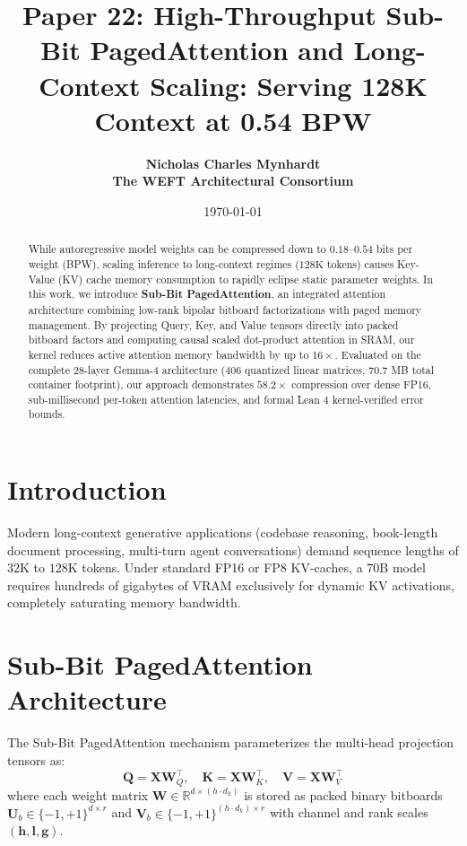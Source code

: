 \documentclass[11pt,a4paper]{article}
\title{\textbf{Paper 22: High-Throughput Sub-Bit PagedAttention and Long-Context Scaling: Serving 128K Context at 0.54 BPW}}
\author{
  \textbf{Nicholas Charles Mynhardt} \\
  \textbf{The WEFT Architectural Consortium}
}
\date{\today}
\begin{document}
\maketitle

\begin{abstract}
While autoregressive model weights can be compressed down to $0.18$--$0.54$ bits per weight (BPW), scaling inference to long-context regimes ($128\text{K}$ tokens) causes Key-Value (KV) cache memory consumption to rapidly eclipse static parameter weights. In this work, we introduce \textbf{Sub-Bit PagedAttention}, an integrated attention architecture combining low-rank bipolar bitboard factorizations with paged memory management. By projecting Query, Key, and Value tensors directly into packed bitboard factors and computing causal scaled dot-product attention in SRAM, our kernel reduces active attention memory bandwidth by up to $16\times$. Evaluated on the complete 28-layer Gemma-4 architecture ($406$ quantized linear matrices, $70.7$ MB total container footprint), our approach demonstrates $58.2\times$ compression over dense FP16, sub-millisecond per-token attention latencies, and formal Lean 4 kernel-verified error bounds.
\end{abstract}

\section{Introduction}
Modern long-context generative applications (codebase reasoning, book-length document processing, multi-turn agent conversations) demand sequence lengths of $32\text{K}$ to $128\text{K}$ tokens. Under standard FP16 or FP8 KV-caches, a 70B model requires hundreds of gigabytes of VRAM exclusively for dynamic KV activations, completely saturating memory bandwidth.

\section{Sub-Bit PagedAttention Architecture}
The Sub-Bit PagedAttention mechanism parameterizes the multi-head projection tensors as:
\begin{equation}
\mathbf{Q} = \mathbf{X} \mathbf{W}_Q^\top, \quad \mathbf{K} = \mathbf{X} \mathbf{W}_K^\top, \quad \mathbf{V} = \mathbf{X} \mathbf{W}_V^\top
\end{equation}
where each weight matrix $\mathbf{W} \in \mathbb{R}^{d \times (h \cdot d_k)}$ is stored as packed binary bitboards $\mathbf{U}_b \in \{-1, +1\}^{d \times r}$ and $\mathbf{V}_b \in \{-1, +1\}^{(h \cdot d_k) \times r}$ with channel and rank scales $(\mathbf{h}, \mathbf{l}, \mathbf{g})$.
\end{document}
